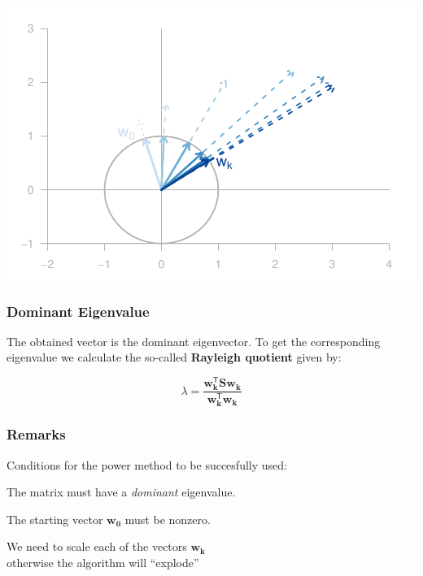 \documentclass[12pt]{beamer}\usepackage[]{graphicx}\usepackage[]{color}
\makeatletter
\def\maxwidth{ %
  \ifdim\Gin@nat@width>\linewidth
    \linewidth
  \else
    \Gin@nat@width
  \fi
}
\newenvironment{knitrout}{}{} %
\makeatother
\begin{document}
\begin{frame}[fragile]

\begin{knitrout}\footnotesize
{}\color{fgcolor}

{\centering \includegraphics[width=\maxwidth]{figure/power-method-rescale-1} 

}



\end{knitrout}

\end{frame}


\begin{frame}
\frametitle{Dominant Eigenvalue}

The obtained vector is the dominant eigenvector. To get the 
corresponding eigenvalue we calculate the so-called \textbf{Rayleigh quotient}
given by:

{\Large
$$
\lambda = \frac{\mathbf{w_{k}^{\mathsf{T}} S w_k}}{\mathbf{w_{k}^{\mathsf{T}} w_k}}
$$
}

\end{frame}


\begin{frame}
\frametitle{Remarks}

Conditions for the power method to be succesfully used: 
\bbi
  \item The matrix must have a \textit{dominant} eigenvalue. 
  \item The starting vector $\mathbf{w_0}$ must be nonzero. 
  \item We need to scale each of the vectors $\mathbf{w_k}$ \\
  {\lolit otherwise the algorithm will ``explode''}
\ei

\end{frame}
\end{document}
